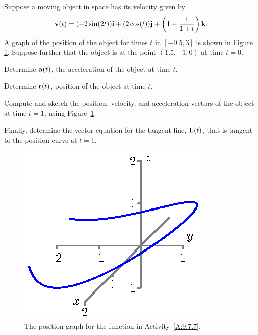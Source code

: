 \begin{activity} \label{A:9.7.7} 
Suppose a moving object in space has its velocity given by
\[\mathbf{v}(t) = (-2\sin(2t)) \mathbf{i} + (2 \cos(t)) \mathbf{j} + \left(1 - \frac{1}{1+t}\right) \mathbf{k}.\]
A graph of the position of the object for times $t$ in $[-0.5,3]$ is shown in Figure \ref{F:9.7.VVD_Example}.  Suppose further that the object is at the point $(1.5,-1,0)$ at time $t=0$. 
	\ba
	\item Determine $\mathbf{a}(t)$, the acceleration of the object at time $t$.

	\item Determine $\mathbf{r}(t)$, position of the object at time $t$.

	\item Compute and sketch the position, velocity, and acceleration vectors of the object at time $t=1$, using Figure~\ref{F:9.7.VVD_Example}.
	
	\item Finally, determine the vector equation for the tangent line, $\mathbf{L}(t)$, that is tangent to the position curve at $t = 1$.

	\ea
\begin{figure}[ht]
\begin{center}
\includegraphics{figures/fig_9_7_activity.eps}
\caption{The position graph for the function in Activity~\ref{A:9.7.7}.}
\label{F:9.7.VVD_Example}
\end{center}
\end{figure}

\end{activity}
\begin{smallhint}

\end{smallhint}
